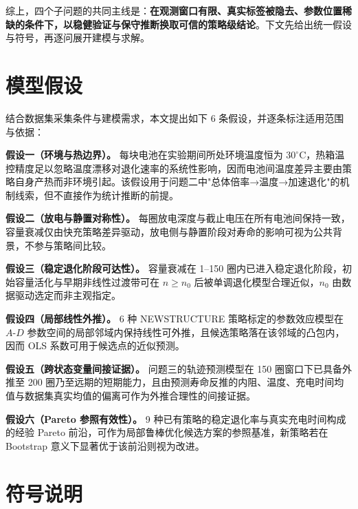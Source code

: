 \documentclass[withoutpreface]{cumcmthesis}
\begin{document}
综上，四个子问题的共同主线是：\textbf{在观测窗口有限、真实标签被隐去、参数位置稀缺的条件下，以稳健验证与保守推断换取可信的策略级结论}。下文先给出统一假设与符号，再逐问展开建模与求解。

\section{模型假设}

结合数据集采集条件与建模需求，本文提出如下 6 条假设，并逐条标注适用范围与依据：

\textbf{假设一（环境与热边界）。} 每块电池在实验期间所处环境温度恒为 $30^\circ$C，热箱温控精度足以忽略温度漂移对退化速率的系统性影响，因而电池间温度差异主要由策略自身产热而非环境引起。该假设用于问题二中"总体倍率→温度→加速退化"的机制线索，但不直接作为统计推断的前提。

\textbf{假设二（放电与静置对称性）。} 每圈放电深度与截止电压在所有电池间保持一致，容量衰减仅由快充策略差异驱动，放电侧与静置阶段对寿命的影响可视为公共背景，不参与策略间比较。

\textbf{假设三（稳定退化阶段可达性）。} 容量衰减在 1--150 圈内已进入稳定退化阶段，初始容量活化与早期非线性过渡带可在 $n\ge n_0$ 后被单调退化模型合理近似，$n_0$ 由数据驱动选定而非主观指定。

\textbf{假设四（局部线性外推）。} 6 种 NEWSTRUCTURE 策略标定的参数效应模型在 $A$-$D$ 参数空间的局部邻域内保持线性可外推，且候选策略落在该邻域的凸包内，因而 OLS 系数可用于候选点的近似预测。

\textbf{假设五（跨状态变量间接证据）。} 问题三的轨迹预测模型在 150 圈窗口下已具备外推至 200 圈乃至远期的短期能力，且由预测寿命反推的内阻、温度、充电时间均值与数据集真实均值的偏离可作为外推合理性的间接证据。

\textbf{假设六（Pareto 参照有效性）。} 9 种已有策略的稳定退化率与真实充电时间构成的经验 Pareto 前沿，可作为局部鲁棒优化候选方案的参照基准，新策略若在 Bootstrap 意义下显著优于该前沿则视为改进。

\section{符号说明}
\end{document}
